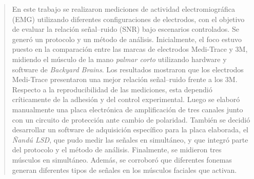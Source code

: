 \documentclass[11pt,letterpaper]{article}
\begin{document}
\begin{abstract}
En este trabajo se realizaron mediciones de actividad electromiográfica (EMG) utilizando diferentes configuraciones de electrodos, con el objetivo de evaluar la relación señal–ruido (SNR) bajo escenarios controlados. Se generó un protocolo y un método de análisis. Inicialmente, el foco estuvo puesto en la comparación entre las marcas de electrodos Medi-Trace y 3M, midiendo el músculo de la mano \textit{palmar corto} utilizando hardware y software de \textit{Backyard Brains}. Los resultados mostraron que los electrodos Medi-Trace presentaron una mejor relación señal–ruido frente a los 3M. Respecto a la reproducibilidad de las mediciones, esta dependió críticamente de la adhesión y del control experimental. Luego se elaboró manualmente una placa electrónica de amplificación de tres canales junto con un circuito de protección ante cambio de polaridad. También se decidió desarrollar un software de adquisición específico para la placa elaborada, el \textit{Ñandú LSD}, que pudo medir las señales en simultáneo, y que integró parte del protocolo y el método de análisis. Finalmente, se midieron tres músculos en simultáneo. Además, se corroboró que diferentes fonemas generan diferentes tipos de señales en los músculos faciales que activan.

\end{abstract}

\vspace{4mm}
\end{document}
